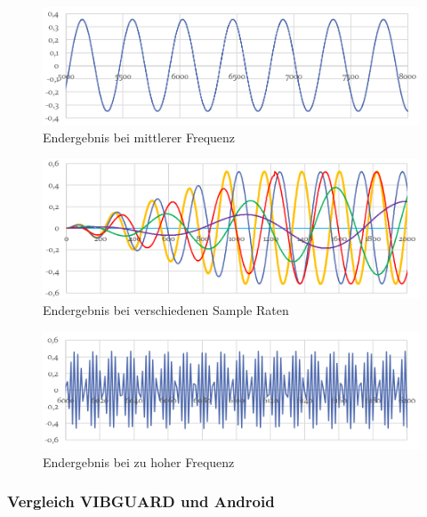 \documentclass{article}
\begin{document}
{				\begin{figure}[ht]
					\centering
					\includegraphics[scale=0.5]{Bilder/Mesurement-Best.PNG}
					\caption{Endergebnis bei mittlerer Frequenz}
					\label{fig4}
				\end{figure}

				\begin{figure}[ht]
					\centering
					\includegraphics[scale=0.5]{Bilder/Messureent_SampleRate.PNG}
					\caption{Endergebnis bei verschiedenen Sample Raten}
					\label{fig5}
				\end{figure}
				
				\begin{figure}[ht]
					\centering
					\includegraphics[scale=0.5]{Bilder/Messurement-tooHeigh.PNG}
					\caption{Endergebnis bei zu hoher Frequenz}
					\label{fig6}
				\end{figure}

\newpage

		\subsubsection{Vergleich VIBGUARD und Android}

}
\end{document}
